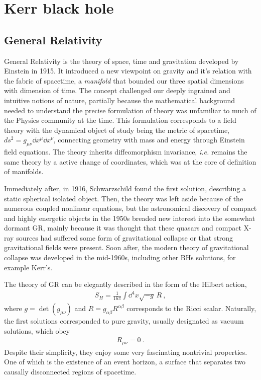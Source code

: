 
\chapter{Kerr black hole} %
\label{Chapter2}


\section{General Relativity}

General Relativity is the theory of space, time and gravitation developed by Einstein in 1915. 
It introduced a new viewpoint on gravity and it's relation with the fabric of spacetime, a \emph{manifold} that bounded our three spatial dimensions with dimension of time.
The concept challenged our deeply ingrained and intuitive notions of nature, partially because the mathematical background needed to understand the precise formulation of theory was unfamiliar to much of the Physics community at the time.
This formulation corresponds to a field theory with the dynamical object of study being the metric of spacetime, $ds^2=g_{\mu\nu} \dd x^\mu \dd x^\nu$, connecting geometry with mass and energy through Einstein field equations.
The theory inherits diffeomorphism invariance, \emph{i.e.} remains the same theory by a active change of coordinates, which was at the core of definition of manifolds.

Immediately after, in 1916, Schwarzschild found the first solution, describing a static spherical isolated object.
Then, the theory was left aside because of the numerous coupled nonlinear equations, but the astronomical discovery of compact and highly energetic objects in the 1950s breaded new interest into the somewhat dormant GR, mainly because it was thought that these quasars and compact X-ray sources had suffered some form of gravitational collapse or that strong gravitational fields were present.
Soon after, the modern theory of gravitational collapse was developed in the mid-1960s, including other BHs solutions, for example Kerr's.

The theory of GR can be elegantly described in the form of the Hilbert action,
\begin{align}
    S_{H} = \frac{1}{16\pi} \int \dd^4 x \sqrt{-g} \,R ~,
    \label{eq2:actionGR}
\end{align}
where $g=\det(g_{\mu\nu})$ and $R=g_{\alpha\beta} R^{\alpha\beta}$ corresponds to the Ricci scalar.
Naturally, the first solutions corresponded to pure gravity, usually designated as vacuum solutions, which obey
\begin{align}
    R_{\mu\nu} = 0 ~.
    \label{eq2:vacuumGR}
\end{align}
Despite their simplicity, they enjoy some very fascinating nontrivial properties. 
One of which is the existence of an event horizon, a surface that separates two causally disconnected regions of spacetime.


